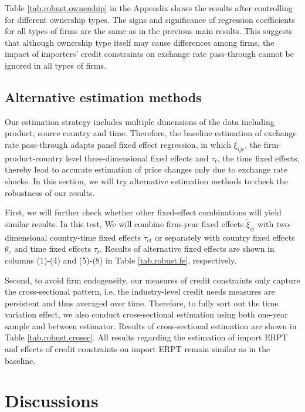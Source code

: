 \documentclass[12pt]{article}
\begin{document}
Table \ref{tab.robust.ownership} in the Appendix shows the results after controlling for different ownership types. The signs and significance of regression coefficients for all types of firms are the same as in the previous main results. This suggests that although ownership type itself may cause differences among firms, the impact of importers' credit constraints on exchange rate pass-through cannot be ignored in all types of firms.

\subsection{Alternative estimation methods}

Our estimation strategy includes multiple dimensions of the data including product, source country and time. Therefore, the baseline estimation of exchange rate pass-through adapts panel fixed effect regression, in which $\xi_{ijc}$, the firm-product-country level three-dimensional fixed effects and $\tau_t$, the time fixed effects, thereby lead to accurate estimation of price changes only due to exchange rate shocks. In this section, we will try alternative estimation methods to check the robustness of our results.

First, we will further check whether other fixed-effect combinations will yield similar results. In this test, We will combine firm-year fixed effects $\tilde{\xi}_{ij}$ with two-dimensional country-time fixed effects $\tilde{\tau}_{ct}$ or separately with country fixed effects $\theta_{c}$ and time fixed effects $\tau_t$.  Results of alternative fixed effects are shown in columns (1)-(4) and (5)-(8) in Table \ref{tab.robust.fe}, respectively. 

Second, to avoid firm endogeneity, our measures of credit constraints only capture the cross-sectional pattern, i.e. the industry-level credit needs measures are persistent and thus averaged over time. Therefore, to fully sort out the time variation effect, we also conduct cross-sectional estimation using both one-year sample and between estimator. Results of cross-sectional estimation are shown in Table \ref{tab.robust.crosec}. All results regarding the estimation of import ERPT and effects of credit constraints on import ERPT remain similar as in the baseline.

\section{Discussions} \label{Discussion}
\end{document}
